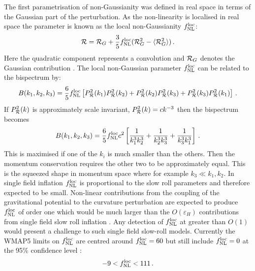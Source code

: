 The first parametrisation of non-Gaussianity was defined in
real space in terms of the Gaussian part of the perturbation. As the
non-linearity is localised in real space the parameter is
known as the local non-Gaussianity $f_{\mathrm{NL}}^\mathrm{loc}$: 
% 
\begin{equation} 
\label{eq:fnllocdefn-intro}
{\cal{R}} = {\cal{R}}_G + \frac{3}{5} f_{\mathrm{NL}}^\mathrm{loc}  (
{\cal{R}}_G^2 -\langle {\cal{R}}_G^2 \rangle )\,.
\end{equation}
Here the 
quadratic component represents a convolution and 
$\mathcal{R}_G$ denotes the Gaussian contribution \cite{maldacena}\footnotemark.
The local non-Gaussian parameter $f_{\mathrm{NL}}^\mathrm{loc}$ can be related to the bispectrum by:
\begin{equation}
 B(k_1, k_2, k_3) = \frac{6}{5}f_{\mathrm{NL}}^\mathrm{loc} \left[P_{\mathcal{R}}^2(k_1)P_{\mathcal{R}}^2(k_2) +
P_{\mathcal{R}}^2(k_2)P_{\mathcal{R}}^2(k_3) + P_{\mathcal{R}}^2(k_3)P_{\mathcal{R}}^2(k_1)\right]\,.
\end{equation}
% 
If $P_{\mathcal{R}}^2(k)$ is approximately scale invariant, $P_{\mathcal{R}}^2(k) = c k^{-3}$ then
the bispectrum becomes \cite{Baumann2009}
% 
\begin{equation}
 B(k_1, k_2, k_3) = \frac{6}{5}f_{\mathrm{NL}}^\mathrm{loc} c^2\left[\frac{1}{k_1^3 k_2^3} +
\frac{1}{k_2^3 k_3^3} + \frac{1}{k_3^3 k_1^3}\right]\,.
\end{equation}
% 
This is maximised if one of the $k_i$ is much smaller than the others. Then the
momentum conservation requires the other two to be approximately equal. This is
the squeezed shape in momentum space where for example $k_3 \ll k_1,k_2$. In
single field inflation $f_{\mathrm{NL}}^\mathrm{loc}$ is proportional to the slow roll parameters
and therefore expected to be small. Non-linear contributions from the coupling
of the gravitational potential to the curvature perturbation are expected to
produce $f_{\mathrm{NL}}^\mathrm{loc}$ of order one which would be much larger than the
$O(\varepsilon_H)$ contributions from single field slow roll inflation
\cite{Bartolo:2004if, Komatsu:2008hk}. Any detection of $f_{\mathrm{NL}}^\mathrm{loc}$ at greater
than $O(1)$ would present a challenge to such single field slow-roll models. 
Currently the WMAP5 limits on $f_{\mathrm{NL}}^\mathrm{loc}$ are centred around $f_{\mathrm{NL}}^\mathrm{loc}=60$ but
still include $f_{\mathrm{NL}}^\mathrm{loc}=0$ at the 95\% confidence level \cite{Komatsu:2008hk}:
\begin{equation}
 -9<f_{\mathrm{NL}}^\mathrm{loc}<111\,.
\end{equation}



